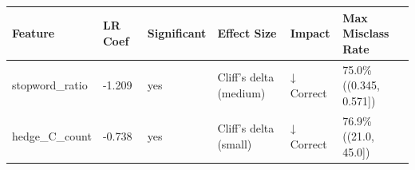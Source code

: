\begin{tabular}{llllll}
\toprule
Feature & LR Coef & Significant & Effect Size & Impact & Max Misclass Rate \\
\midrule
stopword\_ratio & -1.209 & yes & Cliff's delta (medium) & ↓ Correct & 75.0\% ((0.345, 0.571]) \\
hedge\_C\_count & -0.738 & yes & Cliff's delta (small) & ↓ Correct & 76.9\% ((21.0, 45.0]) \\
\bottomrule
\end{tabular}
